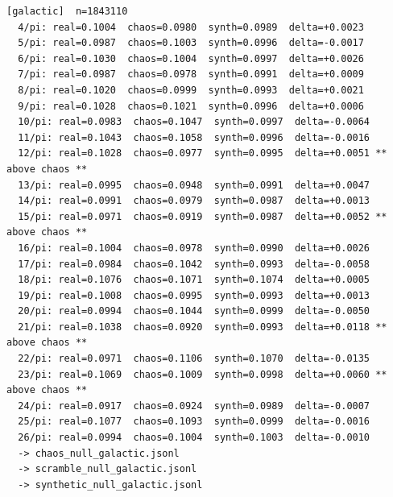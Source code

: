 \documentclass[11pt, letterpaper, openany]{book}
\begin{document}
\begin{empiricalbox}
\begin{lstlisting}[style=terminal]
[galactic]  n=1843110
  4/pi: real=0.1004  chaos=0.0980  synth=0.0989  delta=+0.0023
  5/pi: real=0.0987  chaos=0.1003  synth=0.0996  delta=-0.0017
  6/pi: real=0.1030  chaos=0.1004  synth=0.0997  delta=+0.0026
  7/pi: real=0.0987  chaos=0.0978  synth=0.0991  delta=+0.0009
  8/pi: real=0.1020  chaos=0.0999  synth=0.0993  delta=+0.0021
  9/pi: real=0.1028  chaos=0.1021  synth=0.0996  delta=+0.0006
  10/pi: real=0.0983  chaos=0.1047  synth=0.0997  delta=-0.0064
  11/pi: real=0.1043  chaos=0.1058  synth=0.0996  delta=-0.0016
  12/pi: real=0.1028  chaos=0.0977  synth=0.0995  delta=+0.0051 ** above chaos **
  13/pi: real=0.0995  chaos=0.0948  synth=0.0991  delta=+0.0047
  14/pi: real=0.0991  chaos=0.0979  synth=0.0987  delta=+0.0013
  15/pi: real=0.0971  chaos=0.0919  synth=0.0987  delta=+0.0052 ** above chaos **
  16/pi: real=0.1004  chaos=0.0978  synth=0.0990  delta=+0.0026
  17/pi: real=0.0984  chaos=0.1042  synth=0.0993  delta=-0.0058
  18/pi: real=0.1076  chaos=0.1071  synth=0.1074  delta=+0.0005
  19/pi: real=0.1008  chaos=0.0995  synth=0.0993  delta=+0.0013
  20/pi: real=0.0994  chaos=0.1044  synth=0.0999  delta=-0.0050
  21/pi: real=0.1038  chaos=0.0920  synth=0.0993  delta=+0.0118 ** above chaos **
  22/pi: real=0.0971  chaos=0.1106  synth=0.1070  delta=-0.0135
  23/pi: real=0.1069  chaos=0.1009  synth=0.0998  delta=+0.0060 ** above chaos **
  24/pi: real=0.0917  chaos=0.0924  synth=0.0989  delta=-0.0007
  25/pi: real=0.1077  chaos=0.1093  synth=0.0999  delta=-0.0016
  26/pi: real=0.0994  chaos=0.1004  synth=0.1003  delta=-0.0010
  -> chaos_null_galactic.jsonl
  -> scramble_null_galactic.jsonl
  -> synthetic_null_galactic.jsonl


\end{lstlisting}
\end{empiricalbox}
\end{document}
